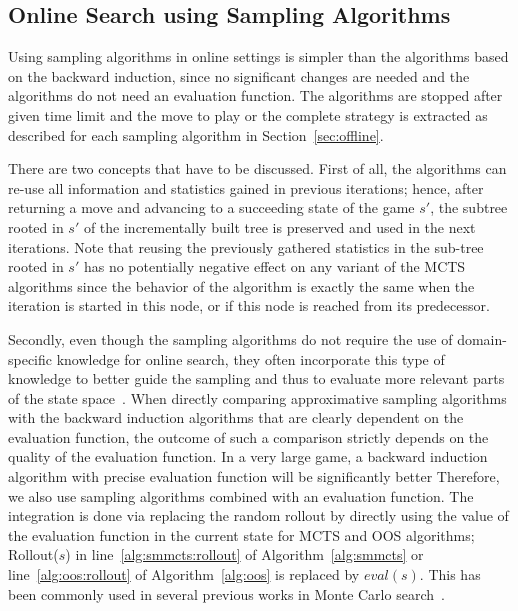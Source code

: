 \subsection{Online Search using Sampling Algorithms}


Using sampling algorithms in online settings is simpler than the algorithms based on the backward induction, since no significant changes are needed and the algorithms do not need an evaluation function.
The algorithms are stopped after given time limit and the move to play or the complete strategy is extracted as described for each sampling algorithm in Section~\ref{sec:offline}.

There are two concepts that have to be discussed.
First of all, the algorithms can re-use all information and statistics gained in previous iterations; hence, after returning a move and advancing to a succeeding state of the game $s'$, the subtree rooted in $s'$ of the incrementally built tree is preserved and used in the next iterations.
Note that reusing the previously gathered statistics in the sub-tree rooted in $s'$ has no potentially negative effect on any variant of the MCTS algorithms since the behavior of the algorithm is exactly the same when the iteration is started in this node, or if this node is reached from its predecessor. 

Secondly, even though the sampling algorithms do not require the use of domain-specific knowledge for online search, they often incorporate this type of knowledge to better guide the sampling and thus to evaluate more relevant parts of the state space~\cite{Gelly07Combining,Lorentz08Amazons,Winands10MCTS-LOA,Lorentz13Breakthrough,Lanctot14Implicit}. When directly comparing approximative sampling algorithms with the backward induction algorithms that are clearly dependent on the evaluation function, the outcome of such a comparison strictly depends on the quality of the evaluation function. In a very large game, a backward induction algorithm with precise evaluation function will be significantly better %
Therefore, we also use sampling algorithms combined with an evaluation function. The integration is done via replacing the random rollout
by directly using the value of the evaluation function in the current state for MCTS and OOS algorithms; \ie Rollout($s$) in
line~\ref{alg:smmcts:rollout} of Algorithm~\ref{alg:smmcts} or line~\ref{alg:oos:rollout} of Algorithm~\ref{alg:oos} is replaced by $eval(s)$.
This has been commonly used in several previous works in Monte Carlo search~\cite{Lorentz08Amazons,Lorentz13Breakthrough,Lanctot14Implicit,RamanujanS11,Lanctot13MCMS}.

